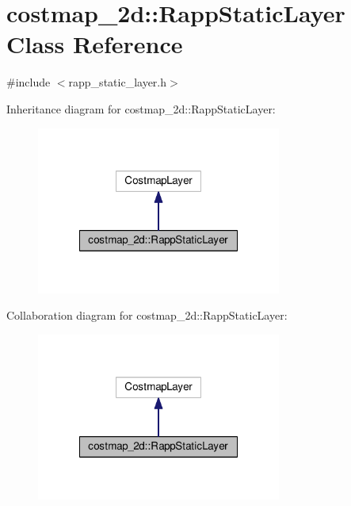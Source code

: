 \hypertarget{classcostmap__2d_1_1RappStaticLayer}{\section{costmap\-\_\-2d\-:\-:Rapp\-Static\-Layer Class Reference}
\label{classcostmap__2d_1_1RappStaticLayer}
}


{\ttfamily \#include $<$rapp\-\_\-static\-\_\-layer.\-h$>$}



Inheritance diagram for costmap\-\_\-2d\-:\-:Rapp\-Static\-Layer\-:
\nopagebreak
\begin{figure}[H]
\begin{center}
\leavevmode
\includegraphics[width=228pt]{classcostmap__2d_1_1RappStaticLayer__inherit__graph}
\end{center}
\end{figure}


Collaboration diagram for costmap\-\_\-2d\-:\-:Rapp\-Static\-Layer\-:
\nopagebreak
\begin{figure}[H]
\begin{center}
\leavevmode
\includegraphics[width=228pt]{classcostmap__2d_1_1RappStaticLayer__coll__graph}
\end{center}
\end{figure}

